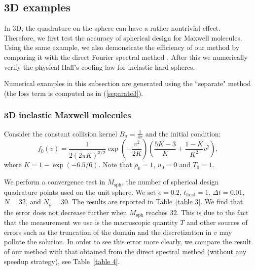 \documentclass[review,times]{elsarticle}
\begin{document}
\subsection{3D examples}

In 3D, the quadrature on the sphere can have a rather nontrivial effect. Therefore, we first test the accuracy of spherical design for Maxwell molecules. Using the same example, we also demonstrate the efficiency of our method by comparing it with the direct Fourier spectral method \cite{FPT05}. After this we numerically verify the physical Haff's cooling law for inelastic hard spheres.

Numerical examples in this subsection are generated using the ``separate" method (the loss term is computed as in (\ref{separate3}).

\subsubsection{3D inelastic Maxwell molecules}

Consider the constant collision kernel $B_{\sigma} = \frac{1}{4\pi}$ and the initial condition:
\begin{equation}\label{3Dbkw}
  f_0(v) = \frac{1}{2(2\pi K)^{3/2}}\exp\left(-\frac{v^2}{2K}\right)\left(\frac{5K-3}{K}+\frac{1-K}{K^2}v^2\right),
\end{equation}
where $K = 1 - \exp(-6.5/6)$. Note that $\rho_0=1$, $u_0=0$ and $T_0=1$.

We perform a convergence test in $M_{\text{sph}}$, the number of spherical design quadrature points used on the unit sphere. We set $e=0.2$, $t_\text{final} = 1$, $\Delta t = 0.01$, $N = 32$, and $N_{\rho}=30$. The results are reported in Table~\ref{table 3}. We find that the error does not decrease further when $M_{\text{sph}}$ reaches $32$. This is due to the fact that the measurement we use is the macroscopic quantity $T$ and other sources of errors such as the truncation of the domain and the discretization in $v$ may pollute the solution. In order to see this error more clearly, we compare the result of our method with that obtained from the direct spectral method (without any speedup strategy), see Table~\ref{table 4}.
\end{document}
